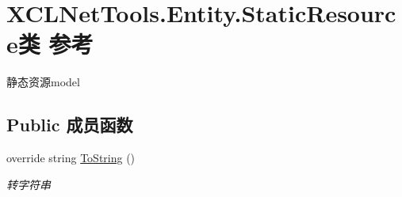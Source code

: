 \hypertarget{class_x_c_l_net_tools_1_1_entity_1_1_static_resource}{\section{X\-C\-L\-Net\-Tools.\-Entity.\-Static\-Resource类 参考}
\label{class_x_c_l_net_tools_1_1_entity_1_1_static_resource}
}


静态资源model  


\subsection*{Public 成员函数}
\begin{DoxyCompactItemize}
\item 
override string \hyperlink{class_x_c_l_net_tools_1_1_entity_1_1_static_resource_a25e28841491afc79dc1f60fb6b42b60c}{To\-String} ()
\begin{DoxyCompactList}\small\item\em 转字符串 \end{DoxyCompactList}\end{DoxyCompactItemize}
